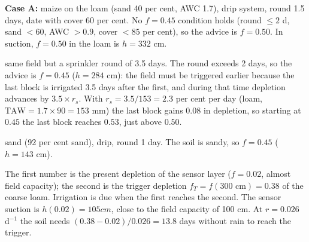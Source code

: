 \textbf{Case A:} maize on the loam (sand 40 per cent, AWC 1.7), drip system, round 1.5 days, date with cover 60 per cent. No $f=0.45$ condition holds (round $\le2$ d, sand $<60$, AWC $>0.9$, cover $<85$ per cent), so the advice is $f=0.50$. In suction, $f=0.50$ in the loam is $h=332$ cm.

 same field but a sprinkler round of 3.5 days. The round exceeds 2 days, so the advice is $f=0.45$ ($h=284$ cm): the field must be triggered earlier because the last block is irrigated 3.5 days after the first, and during that time depletion advances by $3.5\times r_s$. With $r_s=3.5/153=2.3$ per cent per day (loam, $\mathrm{TAW}=1.7\times90=153$ mm) the last block gains $0.08$ in depletion, so starting at $0.45$ the last block reaches $0.53$, just above $0.50$.

 sand (92 per cent sand), drip, round 1 day. The soil is sandy, so $f=0.45$ ($h=143$ cm).


\sol  The first number is the present depletion of the sensor layer ($f=0.02$, almost field capacity); the second is the trigger depletion $f_T=f(300\text{ cm})=0.38$ of the coarse loam. Irrigation is due when the first reaches the second. The sensor suction is $h(0.02)=105 cm$, close to the field capacity of 100 cm. At $r=0.026$ d$^{-1}$ the soil needs $(0.38-0.02)/0.026=13.8$ days without rain to reach the trigger.

